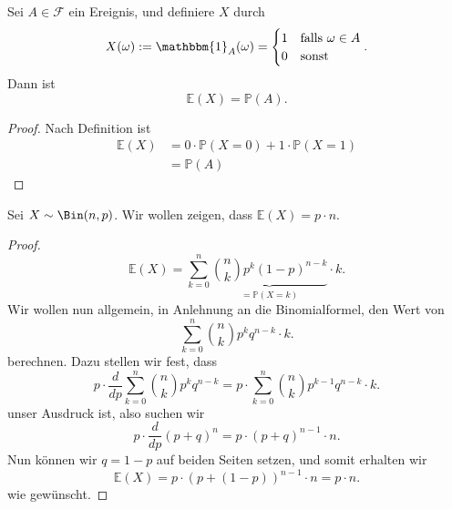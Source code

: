 
\begin{example}
    Sei $A\in \mathcal{F}$ ein Ereignis, und definiere $X$ durch
     \[
         X(\omega) := \mathbbm{1}_{A}(\omega) = \begin{cases}
             1 & \text{falls } \omega\in A \\
             0 & \text{sonst}
         \end{cases}
    .\] 
    Dann ist
    \[
        \mathbb{E}(X) = \mathbb{P}(A)
    .\] 
    \begin{proof}
        Nach Definition ist
        \begin{equation*}
            \begin{split}
                \mathbb{E}(X) &= 0\cdot  \mathbb{P}(X= 0) + 1\cdot \mathbb{P}(X=1)  \\
                              &= \mathbb{P}(A)
            \end{split}
        \end{equation*}
    \end{proof}
\end{example}
\begin{example}[Binomialverteilung]
    Sei $X\sim \Bin(n,p)$. Wir wollen zeigen, dass $\mathbb{E}(X) = p\cdot n$.
    \begin{proof}
        \[
            \mathbb{E}(X) = \sum_{k=0}^n \underbrace{\binom{n}{k} p^k (1-p)^{n-k}}_{=\mathbb{P}(X=k)} \cdot k
        .\]
        Wir wollen nun allgemein, in Anlehnung an die Binomialformel, den Wert von
        \[
            \sum_{k=0}^n \binom{n}{k} p^k q^{n-k}\cdot k
        .\] 
berechnen. Dazu stellen wir fest, dass
\[
    p\cdot \frac{d}{dp} \sum_{k=0}^n \binom{n}{k}p^{k} q^{n-k} = p\cdot \sum_{k=0}^n \binom{n}{k} p^{k-1}q^{n-k}\cdot k
.\] 
unser Ausdruck ist, also suchen wir
\[
    p\cdot \frac{d}{dp}(p+q)^n = p\cdot (p+q)^{n-1}\cdot n
.\] 
Nun können wir $q=1-p$ auf beiden Seiten setzen, und somit erhalten wir
 \[
     \mathbb{E}(X) = p\cdot (p+(1-p))^{n-1}\cdot n = p\cdot n
.\] 
wie gewünscht.
    \end{proof}
\end{example}
